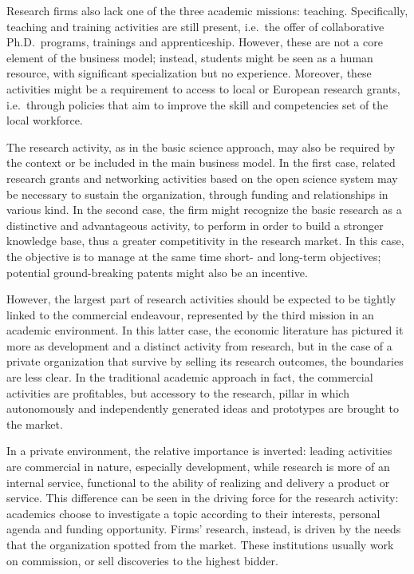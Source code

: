 Research firms also lack one of the three academic missions: teaching. Specifically, teaching and training activities are still present, i.e.\ the offer of collaborative Ph.D.\ programs, trainings and apprenticeship. However, these are not a core element of the business model; instead, students might be seen as a human resource, with significant specialization but no experience. Moreover, these activities might be a requirement to access to local or European research grants, i.e.\ through policies that aim to improve the skill and competencies set of the local workforce. 

The research activity, as in the basic science approach, may also be required by the context or be included in the main business model. In the first case, related research grants and networking activities based on the open science system may be necessary to sustain the organization, through funding and relationships in various kind. In the second case, the firm might recognize the basic research as a distinctive and advantageous activity, to perform in order to build a stronger knowledge base, thus a greater competitivity in the research market. In this case, the objective is to manage at the same time short- and long-term objectives; potential ground-breaking patents might also be an incentive.

However, the largest part of research activities should be expected to be tightly linked to the commercial endeavour, represented by the third mission in an academic environment. In this latter case, the economic literature has pictured it more as development and a distinct activity from research, but in the case of a private organization that survive by selling its research outcomes, the boundaries are less clear. In the traditional academic approach in fact, the commercial activities are profitables, but accessory to the research, pillar in which autonomously and independently generated ideas and prototypes are brought to the market. 

In a private environment, the relative importance is inverted: leading activities are commercial in nature, especially development, while research is more of an internal service, functional to the ability of realizing and delivery a product or service. This difference can be seen in the driving force for the research activity: academics choose to investigate a topic according to their interests, personal agenda and funding opportunity. Firms' research, instead, is driven by the needs that the organization spotted from the market. These institutions usually work on commission, or sell discoveries to the highest bidder. 

